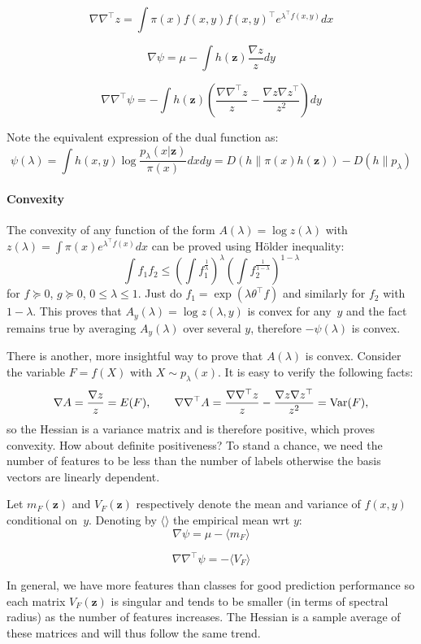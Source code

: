 \documentclass[english]{scrartcl}
\def\y{{\mathbf{y}}}
\def\y{{\mathbf{z}}}
\begin{document}
$$
\nabla \nabla^\top z 
=
\int \pi(x) f(x,y) f(x,y)^\top e^{\lambda^\top f(x,y)} dx
$$

$$
\nabla\psi
= \mu - \int h(\y) \frac{\nabla z}{z} dy
$$

$$
\nabla\nabla^\top\psi
= - \int h(\y) \left(
\frac{\nabla \nabla^\top z}{z} 
- \frac{\nabla z \nabla z^\top}{z^2}
\right)
dy
$$

Note the equivalent expression of the dual function as:
$$
\psi(\lambda)
=
\int h(x,y) \log \frac{p_\lambda(x|\y)}{\pi(x)} dx dy
= D(h\|\pi(x)h(\y)) - D(h\|p_\lambda)
$$


\paragraph{Convexity}

The convexity of any function of the form $A(\lambda)=\log z(\lambda)$ with $z(\lambda)=\int\pi(x)e^{\lambda^\top f(x)}dx$ can be proved using H\"older inequality:
$$
\int f_1 f_2 \leq 
\left(\int f_1^{\frac{1}{\lambda}} \right)^\lambda  
\left(\int f_2^{\frac{1}{1-\lambda}} \right)^{1-\lambda}  
$$
for $f\succeq 0$, $g\succeq 0$, $0\leq\lambda\leq 1$. Just do $f_1=\exp(\lambda\theta^\top f)$ and similarly for $f_2$ with $1-\lambda$. This proves that $A_y(\lambda) = \log z(\lambda,y)$ is convex for any~$y$  and the fact remains true by averaging $A_y(\lambda)$ over several $y$, therefore $-\psi(\lambda)$ is convex.

There is another, more insightful way to prove that $A(\lambda)$ is convex. Consider the variable $F=f(X)$ with $X\sim p_\lambda(x)$. It is easy to verify the following facts:
$$
\nabla A = \frac{\nabla z}{z} = E(F),
\qquad
\nabla\nabla^\top A 
= \frac{\nabla\nabla^\top z}{z} 
- \frac{\nabla z \nabla z^\top}{z^2}
= {\rm Var}(F),
$$
so the Hessian is a variance matrix and is therefore positive, which proves convexity. How about definite positiveness? To stand a chance, we need the number of features to be less than the number of labels otherwise the basis vectors are linearly dependent.

Let $m_F(\y)$ and $V_F(\y)$ respectively denote the mean and variance of $f(x,y)$ conditional on~$y$. Denoting by $\langle \rangle$ the empirical mean wrt $y$:
$$
\nabla \psi = \mu - \langle m_F \rangle
$$

$$
\nabla \nabla^\top \psi = - \langle V_F \rangle
$$

In general, we have more features than classes for good prediction performance so each matrix $V_F(\y)$ is singular and tends to be smaller (in terms of spectral radius) as the number of features increases. The Hessian is a sample average of these matrices and will thus follow the same trend.
\end{document}
